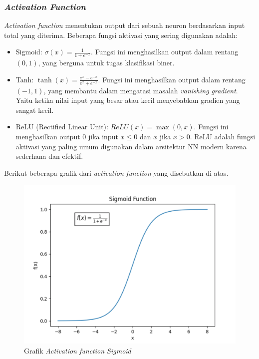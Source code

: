  
 \subsubsection{\emph{Activation Function}}
 \emph{Activation function} menentukan output dari sebuah neuron berdasarkan input total yang diterima. Beberapa fungsi aktivasi yang sering digunakan adalah:
 \begin{itemize}
   \item Sigmoid: \( \sigma(x) = \frac{1}{1 + e^{-x}} \). Fungsi ini menghasilkan output dalam rentang \( (0, 1) \), yang berguna untuk tugas klasifikasi biner.
   \item Tanh: \( \tanh(x) = \frac{e^{x} - e^{-x}}{e^{x} + e^{-x}} \). Fungsi ini menghasilkan output dalam rentang \( (-1, 1) \), yang membantu dalam mengatasi masalah \emph{vanishing gradient}. Yaitu ketika nilai input yang besar atau kecil menyebabkan gradien yang sangat kecil.
   \item ReLU (Rectified Linear Unit): \( ReLU(x) = \max(0, x) \). Fungsi ini menghasilkan output \( 0 \) jika input \( x \leq 0 \) dan \( x \) jika \( x > 0 \). ReLU adalah fungsi aktivasi yang paling umum digunakan dalam arsitektur NN modern karena sederhana dan efektif.
 \end{itemize}

 Berikut beberapa grafik dari \emph{activation function} yang disebutkan di atas.

  \begin{figure}[htbp]
    \centering
    \includegraphics[scale=0.4]{gambar/bab2-grafik-sigmoid.png}
    \caption{Grafik \emph{Activation function Sigmoid}}
    \label{fig:sigmoid_function}
  \end{figure}

